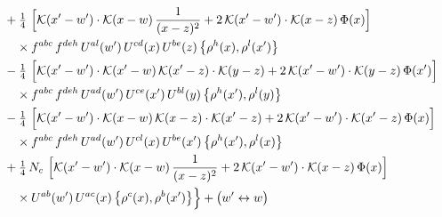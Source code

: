 \documentclass[10pt]{article}
\numberwithin{equation}{section}
\newcommand{\KK}{\mathcal K}
\begin{document}
\begin{align}
&\quad +\tfrac14\,\,\Big[\KK(x'-w')\cdot\KK(x-w)\,\frac{1}{(x-z)^2}+2\,\KK(x'-w')\cdot\KK(x-z)\,\Phi(x)\Big]\notag\\
&\qquad\times f^{abc}\,f^{deh}\,U^{al}(w')\,U^{cd}(x)\,U^{be}(z)\,\big\{\rho^{h}(x),\rho^{l}(x')\big\}\notag\\
&\quad -\tfrac14\,\,\Big[\KK(x'-w')\cdot\KK(x'-w)\,\KK(x'-z)\cdot\KK(y-z)+2\,\KK(x'-w')\cdot\KK(y-z)\,\Phi(x')\Big]\notag\\
&\qquad\times f^{abc}\,f^{deh}\,U^{ad}(w')\,U^{ce}(x')\,U^{bl}(y)\,\big\{\rho^{h}(x'),\rho^{l}(y)\big\}\notag\\
&\quad -\tfrac14\,\,\Big[\KK(x'-w')\cdot\KK(x-w)\,\KK(x-z)\cdot\KK(x'-z)+2\,\KK(x'-w')\cdot\KK(x'-z)\,\Phi(x)\Big]\notag\\
&\qquad\times f^{abc}\,f^{deh}\,U^{ad}(w')\,U^{cl}(x)\,U^{be}(x')\,\big\{\rho^{h}(x'),\rho^{l}(x)\big\}\notag\\
&\quad +\tfrac14\,N_{c}\,\,\Big[\KK(x'-w')\cdot\KK(x-w)\,\frac{1}{(x-z)^2}+2\,\KK(x'-w')\cdot\KK(x-z)\,\Phi(x)\Big]\notag\\
&\qquad\times U^{ab}(w')\,U^{ac}(x)\,\big\{\rho^{c}(x),\rho^{b}(x')\big\}\Big\}+\big(w'\leftrightarrow w\big)\label{eq:sum-GI.III}
\end{align}
\end{document}
